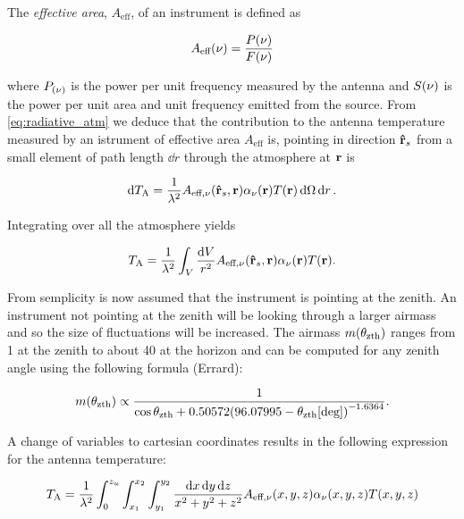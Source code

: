 The \emph{effective area}, $A_\text{eff}$, of an instrument is defined as

\begin{equation}
        A_\text{eff}\qty(\nu) = \frac{P\qty(\nu)}{F\qty(\nu)}
\end{equation}

where $P_\qty(\nu)$ is the power per unit frequency measured by the
antenna and $S\qty(\nu)$ is the power per unit area and unit frequency emitted
from the source.
From \autoref{eq:radiative_atm} we deduce that the contribution to the
antenna temperature measured by an istrument of effective area
$A_\text{eff}$ is, pointing in direction $\vectorunit{r}_s$ from a small
element of path length $\dd{r}$ through the atmosphere at $\vb{r}$ is

\begin{equation}
        \dd{T_\text{A}} = \frac{1}{\lambda^2} A_{\text{eff},\nu}
        \qty(\vectorunit{r}_s,\vb{r}) \alpha_\nu\qty(\vb{r}) T\qty(\vb{r})
        \dd{\Omega}\dd{r}.
\end{equation}

Integrating over all the atmosphere yields

\begin{equation}
        T_\text{A} = \frac{1}{\lambda^2} \int_V \frac{\dd{V}}{r^2}
        A_{\text{eff},\nu} \qty(\vectorunit{r}_s,\vb{r})
        \alpha_\nu\qty(\vb{r}) T\qty(\vb{r}).
\end{equation}

From semplicity is now assumed that the instrument is pointing at the
zenith. An instrument not pointing at the zenith will be looking through a
larger airmass and so the size of fluctuations will be increased.
The airmass $m\qty(\theta_\text{zth})$ ranges from \num{1} at the zenith to
about \num{40} at the horizon and can be computed for any zenith angle
using the following formula (Errard):

\begin{equation}
        m\qty(\theta_\text{zth}) \propto
        \frac{1}{\cos \theta_\text{zth} + 0.50572
        \qty(96.07995 - \theta_\text{zth}[\text{deg}])^{-1.6364}}.
\end{equation}

A change of variables to cartesian coordinates results in the following
expression for the antenna temperature:

\begin{equation}
        T_\text{A} = \frac{1}{\lambda^2} \int^{z_u}_0 \int^{x_2}_{x_1}
        \int^{y_2}_{y_1} \frac{\dd{x}\dd{y}\dd{z}}{x^2 + y^2 + z^2}
        A_{\text{eff},\nu}\qty(x,y,z)
        \alpha_\nu\qty(x,y,z) T\qty(x,y,z)
\end{equation}

